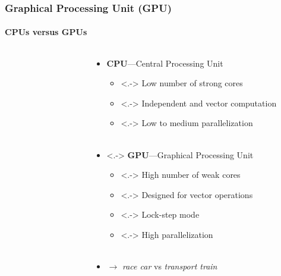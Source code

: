 \documentclass[aspectratio=1610]{beamer}
\begin{document}
\begin{frame}
    \frametitle{Graphical Processing Unit (GPU)}
    \framesubtitle{CPUs versus GPUs}
    
    \begin{columns}
        \begin{column}{0.48\textwidth}
            \begin{figure}
                \centering
            \end{figure}
        \end{column}
        \begin{column}{0.48\textwidth}
            \begin{itemize}
                \item<+-> \textbf{CPU}---Central Processing Unit
                \begin{itemize}
                    \item<.-> Low number of strong cores
                    \item<.-> Independent and vector computation
                    \item<.-> Low to medium parallelization\\~
                \end{itemize}
                \item<.-> \textbf{GPU}---Graphical Processing Unit
                \begin{itemize}
                    \item<.-> High number of weak cores
                    \item<.-> Designed for vector operations
                    \item<.-> Lock-step mode
                    \item<.-> High parallelization\\~
                \end{itemize}
            
                \item<+-> $\rightarrow$ \emph{race car} vs \emph{transport train}
            \end{itemize}
        \end{column}
    \end{columns}
\end{frame}
\end{document}
